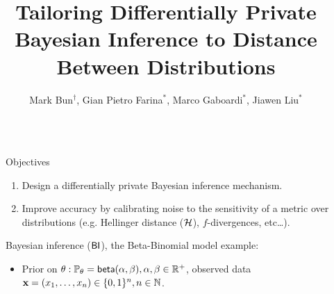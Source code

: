 \documentclass[final,hyperref={pdfpagelabels=false}]{beamer}
\title{\LARGE Tailoring Differentially Private Bayesian Inference to Distance Between Distributions} %
\author{Mark Bun$^\dag$,
Gian Pietro Farina$^{*}$,
Marco Gaboardi$^{*}$,
Jiawen Liu$^{*}$
}
\institute{$^{\dag}$Princeton University, $^{*}$University at Buffalo, SUNY} %
\begin{document}
\begin{frame}[t] %

\begin{columns}[t] %

\begin{column}{.015\textwidth}\end{column} %

\begin{column}{.485\textwidth} %


\begin{block}{Objectives}
\begin{enumerate}
\item Design a differentially private Bayesian inference mechanism.
\item Improve accuracy by calibrating noise  to the sensitivity of a
         metric over distributions (e.g. Hellinger distance ($\mathcal{H}$), $f$-divergences, etc\dots).
\end{enumerate}
\end{block}

            
\begin{block}{Bayesian inference ($\mathsf{BI}$), the Beta-Binomial model example:}
\begin{itemize}
  \item  Prior on {\small $\theta: \mathbb{P}_{\theta}= \mathsf{beta}(\alpha, \beta), \alpha,\beta\in\mathbb{R}^{+}$, observed data $\textbf{x}= (x_1,\dots, x_n)\in\{0,1\}^{n}, n\in\mathbb{N}$.}


\end{itemize}
\end{block}
\end{column}
\end{columns}
\end{frame}
\end{document}
